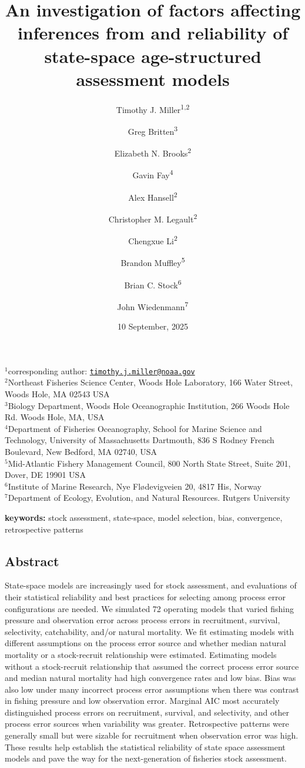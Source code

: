 \documentclass[
  12pt,
]{article}
\title{An investigation of factors affecting inferences from and
reliability of state-space age-structured assessment models}
\author{Timothy J. Miller\textsuperscript{1,2} \and Greg
Britten\textsuperscript{3} \and Elizabeth N.
Brooks\textsuperscript{2} \and Gavin Fay\textsuperscript{4} \and Alex
Hansell\textsuperscript{2} \and Christopher M.
Legault\textsuperscript{2} \and Chengxue
Li\textsuperscript{2} \and Brandon Muffley\textsuperscript{5} \and Brian
C. Stock\textsuperscript{6} \and John Wiedenmann\textsuperscript{7}}
\date{10 September, 2025}
\begin{document}
\maketitle

\(^1\)corresponding author:
\href{mailto:timothy.j.miller@noaa.gov}{\nolinkurl{timothy.j.miller@noaa.gov}}\\
\(^2\)Northeast Fisheries Science Center, Woods Hole Laboratory, 166
Water Street, Woods Hole, MA 02543 USA\\
\(^3\)Biology Department, Woods Hole Oceanographic Institution, 266
Woods Hole Rd. Woods Hole, MA, USA\\
\(^4\)Department of Fisheries Oceanography, School for Marine Science
and Technology, University of Massachusetts Dartmouth, 836 S Rodney
French Boulevard, New Bedford, MA 02740, USA\\
\(^5\)Mid-Atlantic Fishery Management Council, 800 North State Street,
Suite 201, Dover, DE 19901 USA\\
\(^6\)Institute of Marine Research, Nye Flødevigveien 20, 4817 His,
Norway\\
\(^7\)Department of Ecology, Evolution, and Natural Resources. Rutgers
University\\

\pagebreak

\textbf{keywords:} stock assessment, state-space, model selection, bias,
convergence, retrospective patterns

\subsection*{Abstract}\label{abstract}

State-space models are increasingly used for stock assessment, and
evaluations of their statistical reliability and best practices for
selecting among process error configurations are needed. We simulated 72
operating models that varied fishing pressure and observation error
across process errors in recruitment, survival, selectivity,
catchability, and/or natural mortality. We fit estimating models with
different assumptions on the process error source and whether median
natural mortality or a stock-recruit relationship were estimated.
Estimating models without a stock-recruit relationship that assumed the
correct process error source and median natural mortality had high
convergence rates and low bias. Bias was also low under many incorrect
process error assumptions when there was contrast in fishing pressure
and low observation error. Marginal AIC most accurately distinguished
process errors on recruitment, survival, and selectivity, and other
process error sources when variability was greater. Retrospective
patterns were generally small but were sizable for recruitment when
observation error was high. These results help establish the statistical
reliability of state space assessment models and pave the way for the
next-generation of fisheries stock assessment.
\end{document}
